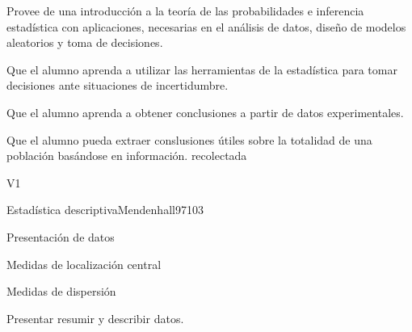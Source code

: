 
\begin{syllabus}


\begin{justification}
Provee de una introducción a la teoría de las probabilidades e inferencia estadística con aplicaciones, necesarias en el análisis de datos, diseño de modelos aleatorios y toma de decisiones.
\end{justification}

\begin{goals}
\item Que el alumno aprenda a utilizar las herramientas de la estadística para tomar decisiones ante situaciones de incertidumbre.
\item Que el alumno aprenda a obtener conclusiones a partir de datos experimentales.
\item Que el alumno pueda extraer conslusiones útiles sobre la totalidad de una población basándose en información. recolectada
\end{goals}

\begin{outcomes}{V1}
\end{outcomes}

\begin{unit}{Estadística descriptiva}{Mendenhall97}{10}{3}
\begin{topics}
      \item Presentación de datos
      \item Medidas de localización central
      \item Medidas de dispersión
   \end{topics}

   \begin{learningoutcomes}
      \item Presentar resumir y describir datos.
   \end{learningoutcomes}
\end{unit}


\end{syllabus}
